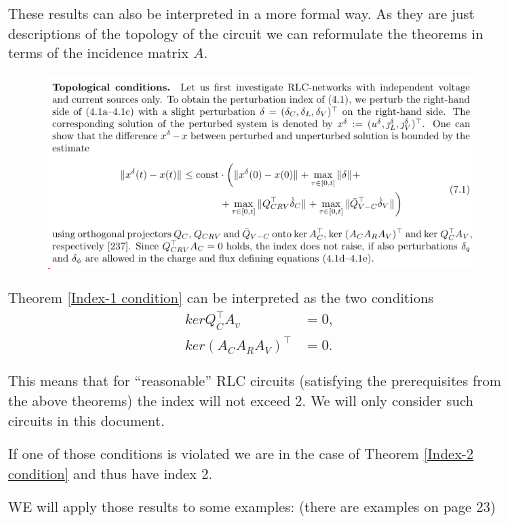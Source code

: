 These results can also be interpreted in a more formal way. As they are just descriptions of the topology of the circuit we can reformulate the theorems in terms of the incidence matrix $A$.

\begin{figure}
	\centering
	\includegraphics[width=0.7\linewidth]{screenshot024}
	\caption{}
	\label{fig:screenshot024}
\end{figure}

Theorem \ref{Index-1 condition} can be interpreted as the two conditions
	\begin{align}
		kerQ_C^\top A_v &= {0}, \\
		ker(A_C A_R A_V)^\top &= {0}.
	\end{align}

This means that for ``reasonable'' RLC circuits (satisfying the prerequisites from the above theorems) the index will not exceed 2. We will only consider such circuits in this document.

If one of those conditions is violated we are in the case of Theorem \ref{Index-2 condition} and thus have index 2.

WE will apply those results to some examples: (there are examples on page 23)